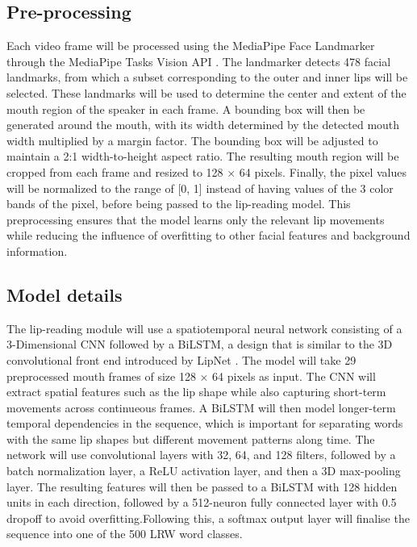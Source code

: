 \documentclass{FastFyp}
\begin{document}
\subsection{Pre-processing}
Each video frame will be processed using the MediaPipe Face Landmarker through the MediaPipe Tasks Vision API \cite{lugaresi2019mediapipe,googlemediapipe2026}. The landmarker detects 478 facial landmarks, from which a subset corresponding to the outer and inner lips will be selected. 
These landmarks will be used to determine the center and extent of the mouth region of the speaker in each frame. A bounding box will then be generated around the mouth, with its width determined by the detected mouth width multiplied by a margin factor. The bounding box will be adjusted to maintain a 2:1 width-to-height aspect ratio. The resulting mouth region will be cropped from each frame and resized to 128 × 64 pixels. Finally, the pixel values will be normalized to the range of [0, 1] instead of having values of the 3 color bands of the pixel, before being passed to the lip-reading model. This preprocessing ensures that the model learns only the relevant lip movements while reducing the influence of overfitting to other facial features and background information.

\subsection{Model details}
The lip-reading module will use a spatiotemporal neural network consisting of a 3-Dimensional CNN followed by a BiLSTM, 
a design that is similar to the 3D convolutional front end introduced by LipNet \cite{assael2016lipnet}. 
The model will take 29 preprocessed mouth frames of size 128 × 64 pixels as input. The CNN will extract spatial features such as the lip shape while also capturing short-term movements across continueous frames. A BiLSTM will then model longer-term temporal dependencies in the sequence, which is important for separating words with the same lip shapes but different movement patterns along time. The network will use convolutional layers with 32, 64, and 128 filters, followed by a batch normalization layer, a ReLU activation layer, and then a 3D max-pooling layer. The resulting features will then be passed to a BiLSTM with 128 hidden units in each direction, followed by a 512-neuron fully connected layer with 0.5 dropoff to avoid overfitting.Following this, a softmax output layer will finalise the sequence into one of the 500 LRW word classes.
\end{document}
